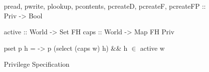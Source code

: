 \begin{figure}[t]
\begin{mcode}
pread, pwrite, plookup, pcontents,
pcreateD, pcreateF, pcreateFP :: Priv -> Bool

active   :: World -> Set FH 
caps     :: World -> Map FH Priv

pset p h = \w -> p (select (caps w) h) && 
                 h $\in$ active w
\end{mcode}
\caption{\label{fig:fstypes} Privilege Specification}
\end{figure}


